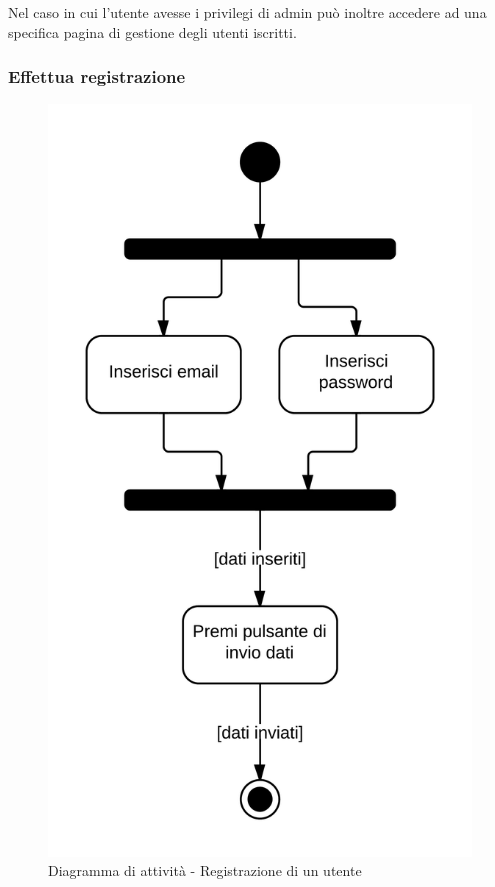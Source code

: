 Nel caso in cui l'utente avesse i privilegi di admin può inoltre accedere ad una specifica pagina di gestione degli utenti iscritti.

\subsubsection{Effettua registrazione}

\begin{figure}[H]
\centering
\includegraphics[scale=0.1]{uml/MaaP - Effettua registrazione.png}
\caption{Diagramma di attività - Registrazione di un utente}
\end{figure}

